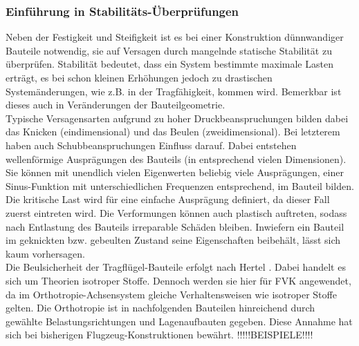 \subsubsection{Einführung in Stabilitäts-Überprüfungen}
Neben der Festigkeit und Steifigkeit ist es bei einer Konstruktion dünnwandiger Bauteile notwendig, sie auf Versagen durch mangelnde statische Stabilität zu überprüfen. Stabilität bedeutet, dass ein System bestimmte maximale Lasten erträgt, es bei schon kleinen Erhöhungen jedoch zu drastischen Systemänderungen, wie z.B. in der Tragfähigkeit, kommen wird. Bemerkbar ist dieses auch in Veränderungen der Bauteilgeometrie.\\

\noindent Typische Versagensarten aufgrund zu hoher Druckbeanspruchungen bilden dabei das Knicken (eindimensional) und das Beulen (zweidimensional). Bei letzterem haben auch Schubbeanspruchungen Einfluss darauf. Dabei entstehen wellenförmige Ausprägungen des Bauteils (in entsprechend vielen Dimensionen). Sie können mit unendlich vielen Eigenwerten beliebig viele Ausprägungen, einer Sinus-Funktion mit unterschiedlichen Frequenzen entsprechend, im Bauteil bilden. Die kritische Last wird für eine einfache Ausprägung definiert, da dieser Fall zuerst eintreten wird. Die Verformungen können auch plastisch auftreten, sodass nach Entlastung des Bauteils irreparable Schäden bleiben. Inwiefern ein Bauteil im geknickten bzw. gebeulten Zustand seine Eigenschaften beibehält, lässt sich kaum vorhersagen.\\

\noindent Die Beulsicherheit der Tragflügel-Bauteile erfolgt nach Hertel \cite{item1}. Dabei handelt es sich um Theorien isotroper Stoffe. Dennoch werden sie hier für FVK angewendet, da im Orthotropie-Achsensystem gleiche Verhaltensweisen wie isotroper Stoffe gelten. Die Orthotropie ist in nachfolgenden Bauteilen hinreichend durch gewählte Belastungsrichtungen und Lagenaufbauten gegeben. Diese Annahme hat sich bei bisherigen Flugzeug-Konstruktionen bewährt. !!!!!BEISPIELE!!!!\\


